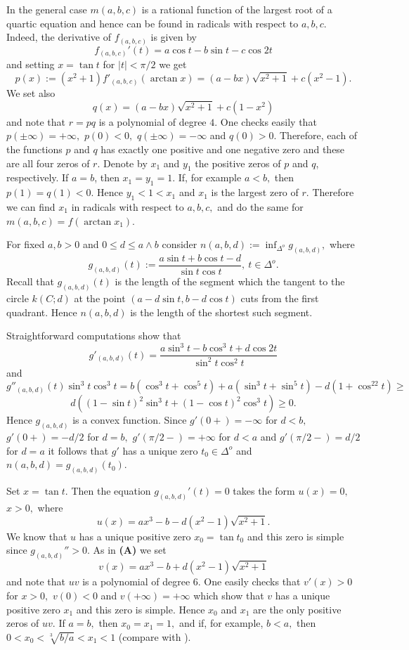 \documentclass[12pt]{amsart}
\def\DD{\Delta}
\def\s{\smallskip}
\def\n{\noindent}
\def\w{\wedge}
\begin{document}
In the general case $m(a,b,c)$ is a rational function of the
largest root of a quartic equation and hence can be found in
radicals with respect to $a,b,c .$ Indeed, the derivative of
$f_{(a,b,c)}$ is given by
$$f_{(a,b,c)}'(t)=a\cos t-b\sin t-c\cos 2t$$ and setting $x=\tan
t$ for $|t|<\pi/2$  we get
$$p(x):=(x^2+1)f'_{(a,b,c)}(\arctan x)=(a-bx)\sqrt{x^2+1}+c(x^2-1).$$
We set also $$q(x)=(a-bx)\sqrt{x^2+1}+c(1-x^2)$$ and note that
$r=pq$ is a polynomial of degree $4$. One checks easily that
$p(\pm\infty)=+\infty,$ $p(0)<0,$ $q(\pm\infty)=-\infty$ and
$q(0)>0.$ Therefore, each of the functions $p$ and $q$ has exactly
one positive and one negative zero and these are all four zeros of
$r.$ Denote by $x_1$ and $y_1$ the positive zeros of $p$ and $q$,
respectively. If $a=b$, then $x_1=y_1=1.$ If, for example $a<b ,$
then $p(1)=q(1)<0$. Hence $y_1<1<x_1$ and $x_1$ is the largest
zero of $r.$ Therefore we can find $x_1$ in radicals with respect
to $a,b,c ,$ and do the same for $m(a,b,c)=f(\arctan x_1).$

\s

\n{\bf B.} For fixed $a, b> 0$ and $0\le d\le a\w b $ consider
$n(a,b,d):=\inf_{\DD^o}g_{(a,b,d)},$ where
$$g_{(a,b,d)}(t):=\frac{a\sin t+b\cos t-d}{\sin t\cos t},\ t\in\DD^o.$$
Recall that $g_{(a,b,d)}(t)$ is the length of the segment which
the tangent to the circle $k(C;d)$ at the point $(a-d\sin
t,b-d\cos t)$ cuts from the first quadrant. Hence $n(a,b,d)$ is
the length of the shortest such segment.

Straightforward computations show that
$$g'_{(a,b,d)}(t)=\frac{a\sin^3t-b\cos^3t+d\cos2t}{\sin^2t\cos^2t}$$
and
$$g''_{(a,b,d)}(t)\sin^3t\cos^3t=b(\cos^3t+\cos^5t)+a(\sin^3t+\sin^5t)-d(1+\cos^22t)\ge$$
$$d((1-\sin t)^2\sin^3t+(1-\cos t)^2\cos^3t)\ge 0 .$$ Hence $g_{(a,b,d)}$ is a
convex function. Since  $g'(0+)=-\infty$ for $d<b,$ $g'(0+)=-d/2$ for $d=b,$
$g'(\pi/2-)=+\infty$ for $d<a$ and $g'(\pi/2-)=d/2$ for $d=a$ it
follows that $g'$ has a unique zero $t_0\in\DD^o$ and
$n(a,b,d)=g_{(a,b,d)}(t_0).$

Set $x=\tan t$. Then the equation $g_{(a,b,d)}'(t)=0$ takes the
form  $u(x)=0,$ $x>0,$ where
$$u(x)=ax^3-b-d(x^2-1)\sqrt{x^2+1}.$$
We know that $u$ has a unique positive zero $x_0=\tan t_0$ and
this zero is simple since $g_{(a,b,d)}''>0.$ As in \textbf{(A)} we
set
$$v(x)=ax^3-b+d(x^2-1)\sqrt{x^2+1}$$
and note that $uv$ is a polynomial of degree $6$. One easily
checks that  $v'(x)>0$ for  $x>0,$ $v(0)<0$ and
$v(+\infty)=+\infty$ which show that $v$ has a unique positive
zero $x_1$ and this zero is simple. Hence $x_0$ and  $x_1$ are the
only positive zeros of $uv.$ If $a=b ,$ then $x_0=x_1=1,$ and if,
for example, $b<a,$ then $0<x_0<\sqrt[3]{b/a}<x_1<1$ (compare with
\cite{Mo}).
\end{document}
